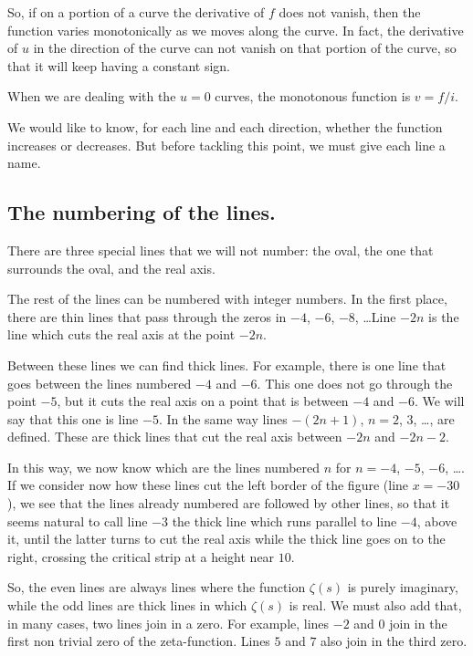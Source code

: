 \documentclass[a4paper]{amsart}
\numberwithin{equation}{section}
\begin{document}
\begin{large}



So, if on a portion of a curve the derivative of $f$ does not vanish, then the
function varies monotonically as we moves along the curve. In fact, the derivative of
$u$ in the direction of the curve can not vanish on that portion of the curve, so
that it will keep having a constant sign.

When we are dealing with the $u=0$ curves, the monotonous function is $v=f/i$.
\medskip

We would like to know, for each line and each direction, whether the function
increases or decreases. But before tackling this point, we must give each line
a name.




\subsection{The numbering of the lines.} 

 There are three special lines that we will
not number: the oval, the one that surrounds the oval, and the real axis.

The rest of the lines can be numbered with integer numbers. In the first place,
there are thin lines that pass through the zeros in $ -4$, $-6$, $-8$, \dots Line
$-2n$ is the line which cuts the real axis at the point $-2n$.

Between these lines we can find thick lines. For example, there is one line
that goes between the lines numbered $-4$ and $-6$. This one does not go
through the point $-5$, but it cuts the real axis on a point that is between
$-4$ and $-6$. We will say that this one is line $-5$. In the same way lines $-(2n
+ 1)$, $n=2$, $3$, \dots, are defined. These are thick lines that cut the real
axis between $-2n$ and $-2n - 2$.

In this way, we now know which are the lines numbered $n$ for $n=-4$, 
$-5$, $-6$,
\dots. If we consider now how these lines cut the left border of the figure
(line
$x=-30$), we see that the lines already numbered are followed by
other lines, so that it seems natural to call line $-3$ the thick line which
runs parallel to line $-4$, above it, until the latter turns to cut the real
axis while the thick line goes on to the right, crossing the critical strip
at a height near $10$.

So, the even lines are always lines where the function $\zeta(s)$ is purely
imaginary, while the odd lines are thick lines in which $\zeta(s)$ is real. We
must also add that, in many cases, two lines join in a zero. For example, lines
$-2$ and $0$ join in the first non trivial zero of the zeta-function. Lines
$5$ and $7$ also join in the third zero.


\end{large}
\end{document}
